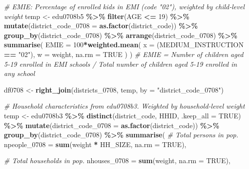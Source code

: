 \documentclass[
]{article}
\newenvironment{Shaded}{\begin{snugshade}}{\end{snugshade}}
\newcommand{\AttributeTok}[1]{\textcolor[rgb]{0.13,0.29,0.53}{#1}}
\newcommand{\CommentTok}[1]{\textcolor[rgb]{0.56,0.35,0.01}{\textit{#1}}}
\newcommand{\ConstantTok}[1]{\textcolor[rgb]{0.56,0.35,0.01}{#1}}
\newcommand{\DecValTok}[1]{\textcolor[rgb]{0.00,0.00,0.81}{#1}}
\newcommand{\FunctionTok}[1]{\textcolor[rgb]{0.13,0.29,0.53}{\textbf{#1}}}
\newcommand{\NormalTok}[1]{#1}
\newcommand{\OtherTok}[1]{\textcolor[rgb]{0.56,0.35,0.01}{#1}}
\newcommand{\SpecialCharTok}[1]{\textcolor[rgb]{0.81,0.36,0.00}{\textbf{#1}}}
\newcommand{\StringTok}[1]{\textcolor[rgb]{0.31,0.60,0.02}{#1}}
\begin{document}
\begin{Shaded}
\begin{Highlighting}[]
\CommentTok{\# EMIE: Percentage of enrolled kids in EMI (code "02"), weighted by child‐level weight}
\NormalTok{temp }\OtherTok{\textless{}{-}}\NormalTok{ edu0708b5 }\SpecialCharTok{\%\textgreater{}\%}
  \FunctionTok{filter}\NormalTok{(AGE }\SpecialCharTok{\textless{}=} \DecValTok{19}\NormalTok{) }\SpecialCharTok{\%\textgreater{}\%}
  \FunctionTok{mutate}\NormalTok{(}\AttributeTok{district\_code\_0708 =} \FunctionTok{as.factor}\NormalTok{(district\_code)) }\SpecialCharTok{\%\textgreater{}\%}
  \FunctionTok{group\_by}\NormalTok{(district\_code\_0708) }\SpecialCharTok{\%\textgreater{}\%}
  \FunctionTok{arrange}\NormalTok{(district\_code\_0708) }\SpecialCharTok{\%\textgreater{}\%} 
  \FunctionTok{summarise}\NormalTok{(}
    \AttributeTok{EMIE =} \DecValTok{100}\SpecialCharTok{*}\FunctionTok{weighted.mean}\NormalTok{(}
      \AttributeTok{x =}\NormalTok{ (MEDIUM\_INSTRUCTION }\SpecialCharTok{==} \StringTok{"02"}\NormalTok{),}
      \AttributeTok{w =}\NormalTok{ weight,}
      \AttributeTok{na.rm =} \ConstantTok{TRUE}
\NormalTok{    )}
\NormalTok{  )}
\CommentTok{\# EMIE = Number of children aged 5{-}19 enrolled in EMI schools / Total number of children aged 5{-}19 enrolled in any school}


\NormalTok{df0708 }\OtherTok{\textless{}{-}} \FunctionTok{right\_join}\NormalTok{(districts\_0708, temp, }\AttributeTok{by =} \StringTok{"district\_code\_0708"}\NormalTok{)}




\CommentTok{\# Household characteristics from edu0708b3. Weighted by household‐level weight}
\NormalTok{temp }\OtherTok{\textless{}{-}}\NormalTok{ edu0708b3 }\SpecialCharTok{\%\textgreater{}\%}
  \FunctionTok{distinct}\NormalTok{(district\_code, HHID, }\AttributeTok{.keep\_all =} \ConstantTok{TRUE}\NormalTok{) }\SpecialCharTok{\%\textgreater{}\%}
  \FunctionTok{mutate}\NormalTok{(}\AttributeTok{district\_code\_0708 =} \FunctionTok{as.factor}\NormalTok{(district\_code)) }\SpecialCharTok{\%\textgreater{}\%}
  \FunctionTok{group\_by}\NormalTok{(district\_code\_0708) }\SpecialCharTok{\%\textgreater{}\%}
  \FunctionTok{summarise}\NormalTok{(}
    \CommentTok{\# Total persons in pop.}
    \AttributeTok{npeople\_0708 =} \FunctionTok{sum}\NormalTok{(weight }\SpecialCharTok{*}\NormalTok{ HH\_SIZE, }\AttributeTok{na.rm =} \ConstantTok{TRUE}\NormalTok{),}

    \CommentTok{\# Total households in pop.}
    \AttributeTok{nhouses\_0708 =} \FunctionTok{sum}\NormalTok{(weight, }\AttributeTok{na.rm =} \ConstantTok{TRUE}\NormalTok{),}


\end{Highlighting}
\end{Shaded}
\end{document}
